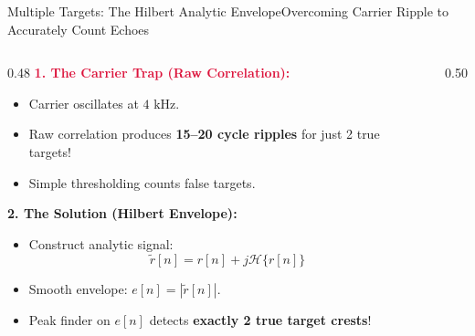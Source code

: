 \documentclass[aspectratio=169, 10pt]{beamer}
\begin{document}
\begin{frame}{Multiple Targets: The Hilbert Analytic Envelope}{Overcoming Carrier Ripple to Accurately Count Echoes}
    \begin{columns}[T]
        \begin{column}{0.48\textwidth}
            \textbf{\textcolor{crimson}{1. The Carrier Trap (Raw Correlation):}}
            \begin{itemize}\small
                \item Carrier oscillates at $4\text{ kHz}$.
                \item Raw correlation produces \textbf{15--20 cycle ripples} for just 2 true targets!
                \item Simple thresholding counts false targets.
            \end{itemize}
            
            \vspace{6pt}
            \textbf{\textcolor{emerald!80!black}{2. The Solution (Hilbert Envelope):}}
            \begin{itemize}\small
                \item Construct analytic signal:
                $$\tilde{r}[n] = r[n] + j \mathcal{H}\{r[n]\}$$
                \item Smooth envelope: $e[n] = |\tilde{r}[n]|$.
                \item Peak finder on $e[n]$ detects \textbf{exactly 2 true target crests}!
            \end{itemize}
        \end{column}
        
        \begin{column}{0.50\textwidth}
\end{column}
\end{columns}
\end{frame}
\end{document}
